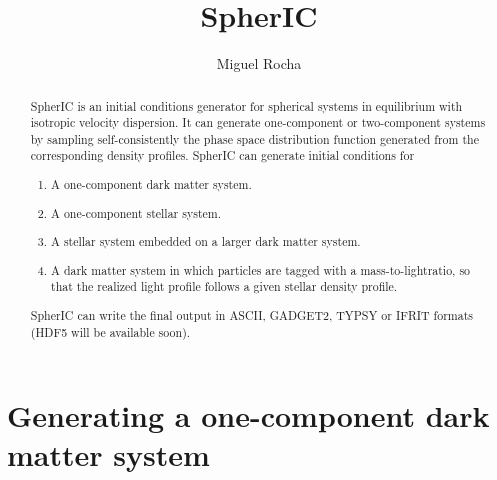 \documentclass[letterpaper,10pt]{article}
\title{SpherIC}
\author{Miguel Rocha}
\begin{document}
\maketitle

\begin{abstract}

SpherIC is an initial conditions generator for spherical systems in equilibrium with isotropic velocity dispersion. It can generate one-component or two-component systems by sampling self-consistently the phase space distribution function generated from the corresponding density profiles. SpherIC can generate initial conditions for

\begin{enumerate}
\item{A one-component dark matter system.}
\item{A one-component stellar system.}
\item{A stellar system embedded on a larger dark matter system.}
\item{A dark matter system in which particles are tagged with a mass-to-light\footnotemark[1] ratio, so that the realized light profile follows a given stellar density profile.}
\end{enumerate}

SpherIC can write the final output in ASCII, GADGET2, TYPSY or IFRIT formats (HDF5 will be available soon).


\end{abstract}

\section{Generating a one-component dark matter system}
\end{document}
